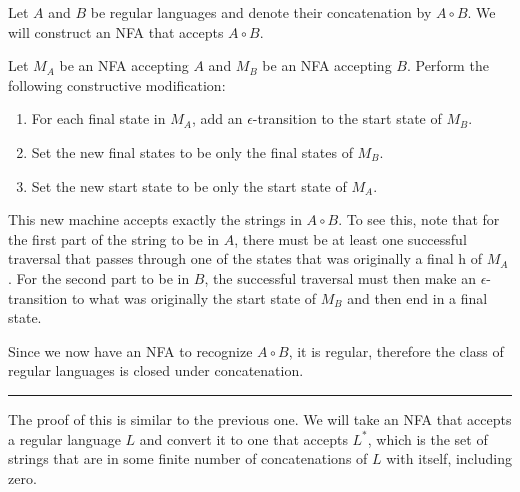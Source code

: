 \documentclass[twoside]{article}
\newenvironment{proof}{{\bf Proof:}}{\hfill\rule{2mm}{2mm}}
\begin{document}
	\begin{proof}
		
		Let $A$ and $B$ be regular languages and denote their concatenation by $A\circ B$.  We will construct an NFA that accepts $A\circ B$.
		
		Let $M_A$ be an NFA accepting $A$ and $M_B$ be an NFA accepting $B$.  Perform the following constructive modification:
		\begin{enumerate}
			\item For each final state in $M_A$, add an $\epsilon$-transition to the start state of $M_B$.
			\item Set the new final states to be only the final states of $M_B$.
			\item Set the new start state to be only the start state of $M_A$.
		\end{enumerate}
		
		This new machine accepts exactly the strings in $A\circ B$.  To see this, note that for the first part of the string to be in $A$, there must be at least one successful traversal that passes through one of the states that was originally a final h of $M_A$.  For the second part to be in $B$, the successful traversal must then make an $\epsilon$-transition to what was originally the start state of $M_B$ and then end in a final state.
		
		Since we now have an NFA to recognize $A \circ B$, it is regular, therefore the class of regular languages is closed under concatenation.
		
		
	\end{proof}
	
	
	
	The proof of this is similar to the previous one.  We will take an NFA that accepts a regular language $L$ and convert it to one that accepts $L^*$, which is the set of strings that are in some finite number of concatenations of $L$ with itself, including zero.
	
\end{document}
